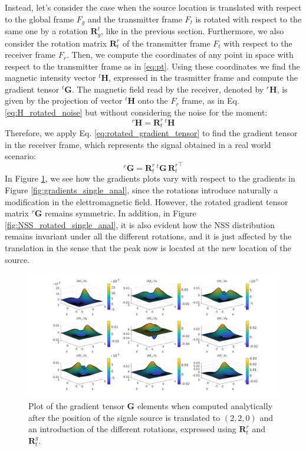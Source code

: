 Instead, let's consider the case when the source location is translated
with respect to the global frame $F_g$ and the transmitter frame $F_t$ is rotated
with respect to the same one by a rotation $\mathbf{R}_g^t$, like in the previous 
section.
Furthermore, we also consider the rotation matrix $\mathbf{R}^r_t$ of the transmitter frame $F_t$ 
with respect to the receiver frame $F_r$.
Then, we compute the coordinates of any point in space with respect to the
transmitter frame as in \ref{eq:pt}.
Using these coordinates we find the magnetic intensity vector ${}^t\mathbf{H}$,
expressed in the trasmitter frame and compute the gradient tensor ${}^t \mathbf{G}$.
The magnetic field read by the receiver, denoted by ${}^r\mathbf{H}$, is given by the projection
of vector ${}^t\mathbf{H}$ onto the $F_r$ frame, as in Eq.\ref{eq:H_rotated_noise} but without considering
the noise for the moment:
\begin{equation}
    {}^r\mathbf{H} = \mathbf{R}^r_t \, {}^t\mathbf{H}
    \label{eq:H_receiver}
\end{equation}
Therefore, we apply Eq. \ref{eq:rotated_gradient_tensor} to find the gradient tensor
in the receiver frame, which represents the signal obtained in a real world scenario:
\begin{equation}
    {}^r \mathbf{G} = \mathbf{R}^r_t \, {}^t\mathbf{G} \, {\mathbf{R}^r_t}^\top
    \label{eq:G_rotated}
\end{equation}
In Figure \ref{fig:gradients_rotated_single_anal}, we see how the gradients plots
vary with respect to the gradients in Figure \ref{fig:gradients_single_anal},
since the rotations introduce naturally a modification in the elettromagnetic field.
However, the rotated gradient tensor matrix ${}^r \mathbf{G}$ remains symmetric.
In addition, in Figure \ref{fig:NSS_rotated_single_anal}, it is also evident how the
NSS distribution remains invariant under all the different rotations, and it is 
just affected by the translation in the sense that the peak now is located
at the new location of the source. 
\begin{figure}
\centering
\hspace*{-0.2\textwidth}
\includegraphics[width=1.4\textwidth]{images/gradients_rotated_single_anal.jpg}
\caption{Plot of the gradient tensor $\mathbf{G}$ elements
when computed analytically after the position of the signle source is translated to $(2,2,0)$ and an 
introduction of the different rotations, expressed using $\mathbf{R}^r_t$ and $\mathbf{R}_t^g$.}
\label{fig:gradients_rotated_single_anal}
\end{figure}
